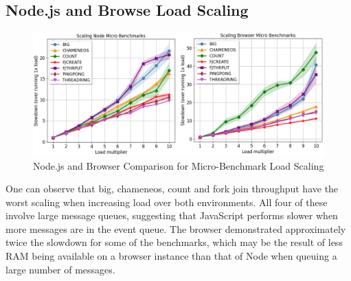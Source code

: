 \documentclass[oneside]{um-fict}
\begin{document}
\subsection{Node.js and Browse Load Scaling}
\begin{figure}[H]
    \begin{centering}
        \includegraphics[width=\textwidth]{resources/load_scaling.png}
        \caption{Node.js and Browser Comparison for Micro-Benchmark Load Scaling}
    \end{centering}
\end{figure}
One can observe that big, chameneos, count and fork join throughput have the worst scaling when increasing load over both environments. All four of these involve large message queues, suggesting that JavaScript performs slower when more messages are in the event queue. The browser demonstrated approximately twice the slowdown for some of the benchmarks, which may be the result of less RAM being available on a browser instance than that of Node when queuing a large number of messages.
\end{document}

